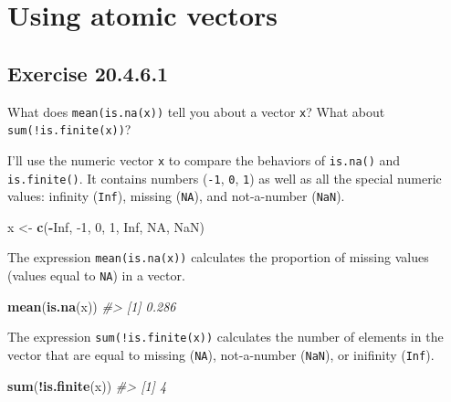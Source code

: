 \documentclass[]{book}
\newenvironment{Shaded}{\begin{snugshade}}{\end{snugshade}}
\newcommand{\CommentTok}[1]{\textcolor[rgb]{0.56,0.35,0.01}{\textit{#1}}}
\newcommand{\DecValTok}[1]{\textcolor[rgb]{0.00,0.00,0.81}{#1}}
\newcommand{\KeywordTok}[1]{\textcolor[rgb]{0.13,0.29,0.53}{\textbf{#1}}}
\newcommand{\NormalTok}[1]{#1}
\newcommand{\OperatorTok}[1]{\textcolor[rgb]{0.81,0.36,0.00}{\textbf{#1}}}
\newcommand{\OtherTok}[1]{\textcolor[rgb]{0.56,0.35,0.01}{#1}}
\newcommand{\StringTok}[1]{\textcolor[rgb]{0.31,0.60,0.02}{#1}}
\theoremstyle{plain}
\theoremstyle{remark}
\begin{document}
\hypertarget{using-atomic-vectors}{%
\section{Using atomic vectors}\label{using-atomic-vectors}}

\hypertarget{exercise-20.4.6.1}{%
\subsection*{\texorpdfstring{Exercise
{20.4.6.1}}{Exercise 20.4.6.1}}\label{exercise-20.4.6.1}}

What does \texttt{mean(is.na(x))} tell you about a vector \texttt{x}?
What about \texttt{sum(!is.finite(x))}?

I'll use the numeric vector \texttt{x} to compare the behaviors of
\texttt{is.na()} and \texttt{is.finite()}. It contains numbers
(\texttt{-1}, \texttt{0}, \texttt{1}) as well as all the special numeric
values: infinity (\texttt{Inf}), missing (\texttt{NA}), and not-a-number
(\texttt{NaN}).

\begin{Shaded}
\begin{Highlighting}[]
\NormalTok{x <-}\StringTok{ }\KeywordTok{c}\NormalTok{(}\OperatorTok{-}\OtherTok{Inf}\NormalTok{, }\DecValTok{-1}\NormalTok{, }\DecValTok{0}\NormalTok{, }\DecValTok{1}\NormalTok{, }\OtherTok{Inf}\NormalTok{, }\OtherTok{NA}\NormalTok{, }\OtherTok{NaN}\NormalTok{)}
\end{Highlighting}
\end{Shaded}

The expression \texttt{mean(is.na(x))} calculates the proportion of
missing values (values equal to \texttt{NA}) in a vector.

\begin{Shaded}
\begin{Highlighting}[]
\KeywordTok{mean}\NormalTok{(}\KeywordTok{is.na}\NormalTok{(x))}
\CommentTok{#> [1] 0.286}
\end{Highlighting}
\end{Shaded}

The expression \texttt{sum(!is.finite(x))} calculates the number of
elements in the vector that are equal to missing (\texttt{NA}),
not-a-number (\texttt{NaN}), or inifinity (\texttt{Inf}).

\begin{Shaded}
\begin{Highlighting}[]
\KeywordTok{sum}\NormalTok{(}\OperatorTok{!}\KeywordTok{is.finite}\NormalTok{(x))}
\CommentTok{#> [1] 4}
\end{Highlighting}
\end{Shaded}
\end{document}

